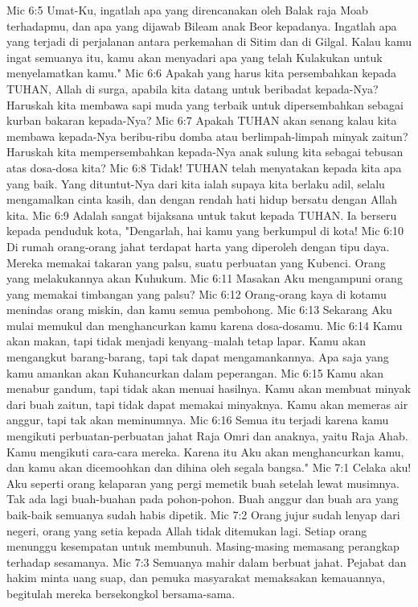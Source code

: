 Mic 6:5  Umat-Ku, ingatlah apa yang direncanakan oleh Balak raja Moab terhadapmu, dan apa yang dijawab Bileam anak Beor kepadanya. Ingatlah apa yang terjadi di perjalanan antara perkemahan di Sitim dan di Gilgal. Kalau kamu ingat semuanya itu, kamu akan menyadari apa yang telah Kulakukan untuk menyelamatkan kamu."
Mic 6:6  Apakah yang harus kita persembahkan kepada TUHAN, Allah di surga, apabila kita datang untuk beribadat kepada-Nya? Haruskah kita membawa sapi muda yang terbaik untuk dipersembahkan sebagai kurban bakaran kepada-Nya?
Mic 6:7  Apakah TUHAN akan senang kalau kita membawa kepada-Nya beribu-ribu domba atau berlimpah-limpah minyak zaitun? Haruskah kita mempersembahkan kepada-Nya anak sulung kita sebagai tebusan atas dosa-dosa kita?
Mic 6:8  Tidak! TUHAN telah menyatakan kepada kita apa yang baik. Yang dituntut-Nya dari kita ialah supaya kita berlaku adil, selalu mengamalkan cinta kasih, dan dengan rendah hati hidup bersatu dengan Allah kita.
Mic 6:9  Adalah sangat bijaksana untuk takut kepada TUHAN. Ia berseru kepada penduduk kota, "Dengarlah, hai kamu yang berkumpul di kota!
Mic 6:10  Di rumah orang-orang jahat terdapat harta yang diperoleh dengan tipu daya. Mereka memakai takaran yang palsu, suatu perbuatan yang Kubenci. Orang yang melakukannya akan Kuhukum.
Mic 6:11  Masakan Aku mengampuni orang yang memakai timbangan yang palsu?
Mic 6:12  Orang-orang kaya di kotamu menindas orang miskin, dan kamu semua pembohong.
Mic 6:13  Sekarang Aku mulai memukul dan menghancurkan kamu karena dosa-dosamu.
Mic 6:14  Kamu akan makan, tapi tidak menjadi kenyang--malah tetap lapar. Kamu akan mengangkut barang-barang, tapi tak dapat mengamankannya. Apa saja yang kamu amankan akan Kuhancurkan dalam peperangan.
Mic 6:15  Kamu akan menabur gandum, tapi tidak akan menuai hasilnya. Kamu akan membuat minyak dari buah zaitun, tapi tidak dapat memakai minyaknya. Kamu akan memeras air anggur, tapi tak akan meminumnya.
Mic 6:16  Semua itu terjadi karena kamu mengikuti perbuatan-perbuatan jahat Raja Omri dan anaknya, yaitu Raja Ahab. Kamu mengikuti cara-cara mereka. Karena itu Aku akan menghancurkan kamu, dan kamu akan dicemoohkan dan dihina oleh segala bangsa."
Mic 7:1  Celaka aku! Aku seperti orang kelaparan yang pergi memetik buah setelah lewat musimnya. Tak ada lagi buah-buahan pada pohon-pohon. Buah anggur dan buah ara yang baik-baik semuanya sudah habis dipetik.
Mic 7:2  Orang jujur sudah lenyap dari negeri, orang yang setia kepada Allah tidak ditemukan lagi. Setiap orang menunggu kesempatan untuk membunuh. Masing-masing memasang perangkap terhadap sesamanya.
Mic 7:3  Semuanya mahir dalam berbuat jahat. Pejabat dan hakim minta uang suap, dan pemuka masyarakat memaksakan kemauannya, begitulah mereka bersekongkol bersama-sama.
